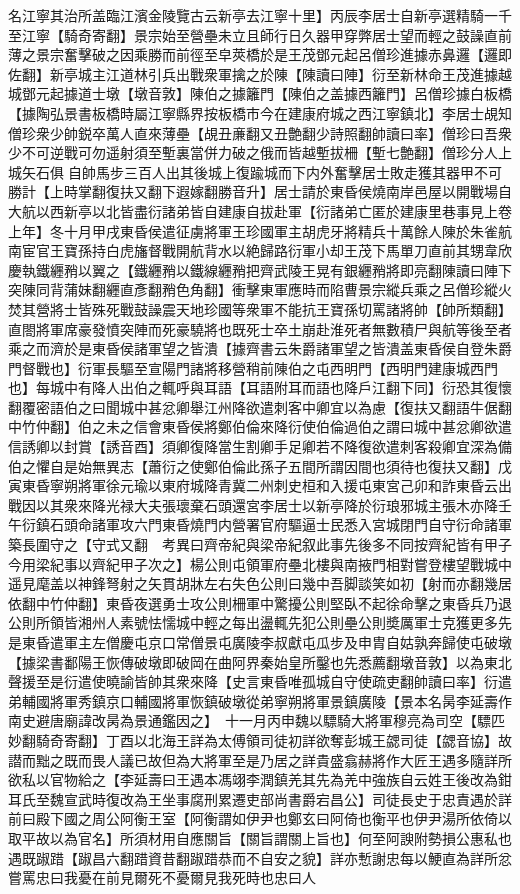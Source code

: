 名江寧其治所盖臨江濱金陵覽古云新亭去江寧十里】丙辰李居士自新亭選精騎一千至江寧【騎奇寄翻】景宗始至營壘未立且師行日久器甲穿弊居士望而輕之鼓譟直前薄之景宗奮擊破之因乘勝而前徑至皁莢橋於是王茂鄧元起呂僧珍進據赤鼻邏【邏即佐翻】新亭城主江道林引兵出戰衆軍擒之於陳【陳讀曰陣】衍至新林命王茂進據越城鄧元起據道士墩【墩音敦】陳伯之據籬門【陳伯之盖據西籬門】呂僧珍據白板橋【據陶弘景書板橋時屬江寧縣界按板橋市今在建康府城之西江寧鎮北】李居士覘知僧珍衆少帥鋭卒萬人直來薄壘【覘丑亷翻又丑艶翻少詩照翻帥讀曰率】僧珍曰吾衆少不可逆戰可勿遥射須至塹裏當併力破之俄而皆越塹拔柵【塹七艶翻】僧珍分人上城矢石俱自帥馬步三百人出其後城上復踰城而下内外奮擊居士敗走獲其器甲不可勝計【上時掌翻復扶又翻下遐嫁翻勝音升】居士請於東昏侯燒南岸邑屋以開戰場自大航以西新亭以北皆盡衍諸弟皆自建康自拔赴軍【衍諸弟亡匿於建康里巷事見上卷上年】冬十月甲戌東昏侯遣征虜將軍王珍國軍主胡虎牙將精兵十萬餘人陳於朱雀航南宦官王寶孫持白虎旛督戰開航背水以絶歸路衍軍小却王茂下馬單刀直前其甥韋欣慶執鐵纒矟以翼之【鐵纒矟以鐵線纒矟把齊武陵王晃有銀纒矟將即亮翻陳讀曰陣下突陳同背蒲妹翻纒直彥翻矟色角翻】衝擊東軍應時而陷曹景宗縱兵乘之呂僧珍縱火焚其營將士皆殊死戰鼓譟震天地珍國等衆軍不能抗王寶孫切罵諸將帥【帥所類翻】直閤將軍席豪發憤突陣而死豪驍將也既死士卒土崩赴淮死者無數積尸與航等後至者乘之而濟於是東昏侯諸軍望之皆潰【據齊書云朱爵諸軍望之皆潰盖東昏侯自登朱爵門督戰也】衍軍長驅至宣陽門諸將移營稍前陳伯之屯西明門【西明門建康城西門也】每城中有降人出伯之輒呼與耳語【耳語附耳而語也降戶江翻下同】衍恐其復懷翻覆密語伯之曰聞城中甚忿卿舉江州降欲遣刺客中卿宜以為慮【復扶又翻語牛倨翻中竹仲翻】伯之未之信會東昏侯將鄭伯倫來降衍使伯倫過伯之謂曰城中甚忿卿欲遣信誘卿以封賞【誘音酉】須卿復降當生割卿手足卿若不降復欲遣刺客殺卿宜深為備伯之懼自是始無異志【蕭衍之使鄭伯倫此孫子五間所謂因間也須待也復扶又翻】戊寅東昏寧朔將軍徐元瑜以東府城降青冀二州刺史桓和入援屯東宮己卯和詐東昏云出戰因以其衆來降光禄大夫張瓌棄石頭還宮李居士以新亭降於衍琅邪城主張木亦降壬午衍鎮石頭命諸軍攻六門東昏燒門内營署官府驅逼士民悉入宮城閉門自守衍命諸軍築長圍守之【守式又翻　考異曰齊帝紀與梁帝紀叙此事先後多不同按齊紀皆有甲子今用梁紀事以齊紀甲子次之】楊公則屯領軍府壘北樓與南掖門相對嘗登樓望戰城中遥見麾盖以神鋒弩射之矢貫胡牀左右失色公則曰幾中吾脚談笑如初【射而亦翻幾居依翻中竹仲翻】東昏夜選勇士攻公則柵軍中驚擾公則堅臥不起徐命擊之東昏兵乃退公則所領皆湘州人素號怯懦城中輕之每出盪輒先犯公則壘公則奬厲軍士克獲更多先是東昏遣軍主左僧慶屯京口常僧景屯廣陵李叔獻屯瓜步及申胄自姑孰奔歸使屯破墩【據梁書鄱陽王恢傳破墩即破岡在曲阿界秦始皇所鑿也先悉薦翻墩音敦】以為東北聲援至是衍遣使曉諭皆帥其衆來降【史言東昏唯孤城自守使疏吏翻帥讀曰率】衍遣弟輔國將軍秀鎮京口輔國將軍恢鎮破墩從弟寧朔將軍景鎮廣陵【景本名昺李延壽作南史避唐廟諱改昺為景通鑑因之】　十一月丙申魏以驃騎大將軍穆亮為司空【驃匹妙翻騎奇寄翻】丁酉以北海王詳為太傅領司徒初詳欲奪彭城王勰司徒【勰音協】故譛而黜之既而畏人議已故但為大將軍至是乃居之詳貴盛翕赫將作大匠王遇多隨詳所欲私以官物給之【李延壽曰王遇本馮翊李潤鎮羌其先為羌中強族自云姓王後改為鉗耳氏至魏宣武時復改為王坐事腐刑累遷吏部尚書爵宕昌公】司徒長史于忠責遇於詳前曰殿下國之周公阿衡王室【阿衡謂如伊尹也鄭玄曰阿倚也衡平也伊尹湯所依倚以取平故以為官名】所須材用自應關旨【關旨謂關上旨也】何至阿諛附勢損公惠私也遇既踧踖【踧昌六翻踖資昔翻踧踖恭而不自安之貌】詳亦慙謝忠每以鯁直為詳所忿嘗罵忠曰我憂在前見爾死不憂爾見我死時也忠曰人